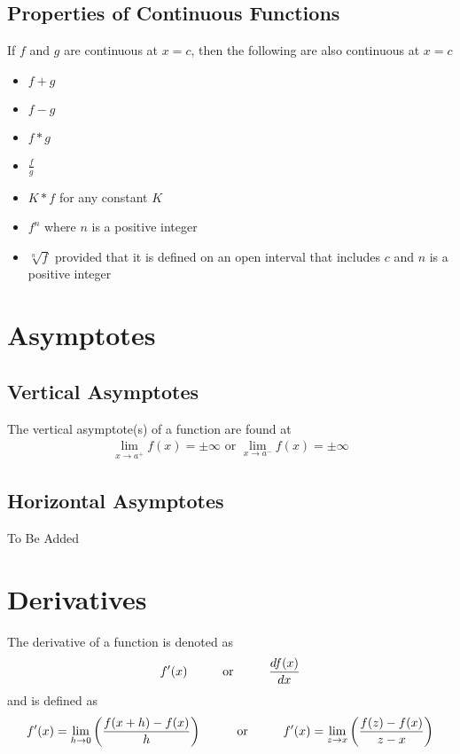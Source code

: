 \documentclass{article}
\newcommand\tab[1][1cm]{\hspace*{#1}}
\newcommand\limhz{\lim_{h\to 0}}
\newcommand\limxar{\lim_{x\to a^+}}
\newcommand\limxal{\lim_{x\to a^-}}
\begin{document}
    \subsection{Properties of Continuous Functions}
        If \(f\) and \(g\) are continuous at \(x=c\), then the following are also continuous at \(x=c\)
        \begin{itemize}[label={}]
            \item \(f+g\)
            \item \(f-g\)
            \item \(f*g\)
            \item \(\frac{f}{g}\)
            \item \(K*f\) for any constant \(K\)
            \item \(f^n\) where \(n\) is a positive integer
            \item \(\sqrt[n]{f}\) provided that it is defined on an open interval that includes \(c\) and \(n\) is a positive integer
        \end{itemize}
\section{Asymptotes}
    \subsection{Vertical Asymptotes}
        The vertical asymptote(s) of a function are found at
        \begin{gather*}
            \limxar f(x) = \pm \infty \text{ or } \limxal f(x) = \pm \infty
        \end{gather*}
    \subsection{Horizontal Asymptotes}
        To Be Added
\section{Derivatives}
    The derivative of a function is denoted as
    \begin{gather*}
        f'(x) \text{\tab or\tab} \frac{df(x)}{dx}
    \end{gather*}
    and is defined as 
    \begin{gather*}
        f'(x)  = \limhz \left(\frac{f(x+h)-f(x)}{h}\right)\text{\tab or\tab} f'(x) = \lim_{z\to x}\left(\frac{f(z)-f(x)}{z-x}\right)
    \end{gather*}
\end{document}
